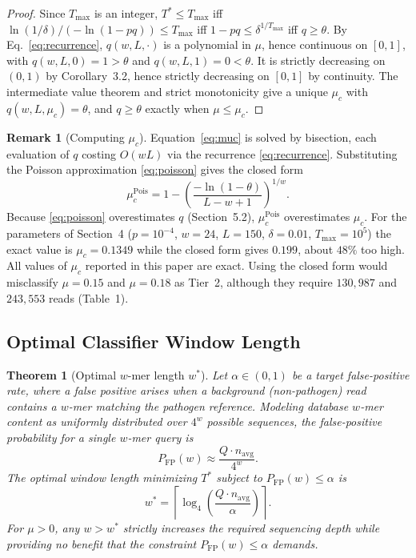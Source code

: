\documentclass[12pt]{article}
\theoremstyle{definition}
\newtheorem{remark}[definition]{Remark}
\theoremstyle{plain}
\newtheorem{theorem}{Theorem}[section]
\begin{document}
\begin{proof}
Since $T_{\max}$ is an integer, $T^{*}\le T_{\max}$ iff
$\ln(1/\delta)/(-\ln(1-pq))\le T_{\max}$ iff $1-pq\le\delta^{1/T_{\max}}$
iff $q\ge\theta$. By Eq.~\eqref{eq:recurrence}, $q(w,L,\cdot)$ is a
polynomial in $\mu$, hence continuous on $[0,1]$, with $q(w,L,0)=1>\theta$
and $q(w,L,1)=0<\theta$. It is strictly decreasing on $(0,1)$ by
Corollary~3.2, hence strictly decreasing on $[0,1]$ by continuity. The
intermediate value theorem and strict monotonicity give a unique $\mu_c$
with $q(w,L,\mu_c)=\theta$, and $q\ge\theta$ exactly when $\mu\le\mu_c$.
\end{proof}

\begin{remark}[Computing $\mu_c$]\label{rem:compmuc}
Equation~\eqref{eq:muc} is solved by bisection, each evaluation of $q$
costing $O(wL)$ via the recurrence \eqref{eq:recurrence}. Substituting the
Poisson approximation \eqref{eq:poisson} gives the closed form
\[
  \mu_c^{\mathrm{Pois}}=1-\left(\frac{-\ln(1-\theta)}{L-w+1}\right)^{1/w}.
\]
Because \eqref{eq:poisson} overestimates $q$ (Section~5.2),
$\mu_c^{\mathrm{Pois}}$ overestimates $\mu_c$. For the parameters of
Section~4 ($p=10^{-4}$, $w=24$, $L=150$, $\delta=0.01$, $T_{\max}=10^5$) the
exact value is $\mu_c=0.1349$ while the closed form gives $0.199$, about $48\%$
too high. All values of $\mu_c$ reported in this paper are exact. Using the
closed form would misclassify $\mu=0.15$ and $\mu=0.18$ as Tier~2, although
they require $130{,}987$ and $243{,}553$ reads (Table~1).
\end{remark}

\subsection{Optimal Classifier Window Length}

\begin{theorem}[Optimal $w$-mer length $w^{*}$]\label{thm:wstar}
Let $\alpha\in(0,1)$ be a target false-positive rate, where a false positive
arises when a background (non-pathogen) read contains a $w$-mer matching the
pathogen reference. Modeling database $w$-mer content as uniformly
distributed over $4^{w}$ possible sequences, the false-positive probability
for a single $w$-mer query is
\begin{equation}\label{eq:pfp}
  P_{\mathrm{FP}}(w)\approx\frac{Q\cdot n_{\mathrm{avg}}}{4^{w}}.
\end{equation}
The optimal window length minimizing $T^{*}$ subject to
$P_{\mathrm{FP}}(w)\le\alpha$ is
\begin{equation}\label{eq:wstar}
  w^{*}=\left\lceil\log_4\!\left(\frac{Q\cdot n_{\mathrm{avg}}}{\alpha}\right)\right\rceil.
\end{equation}
For $\mu>0$, any $w>w^{*}$ strictly increases the required sequencing depth
while providing no benefit that the constraint
$P_{\mathrm{FP}}(w)\le\alpha$ demands.
\end{theorem}
\end{document}

